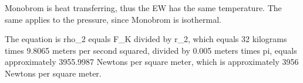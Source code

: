 Monobrom is heat transferring, thus the EW has the same temperature. The same applies to the pressure, since Monobrom is isothermal.

The equation is rho_2 equals F_K divided by r_2, which equals 32 kilograms times 9.8065 meters per second squared, divided by 0.005 meters times pi, equals approximately 3955.9987 Newtons per square meter, which is approximately 3956 Newtons per square meter.